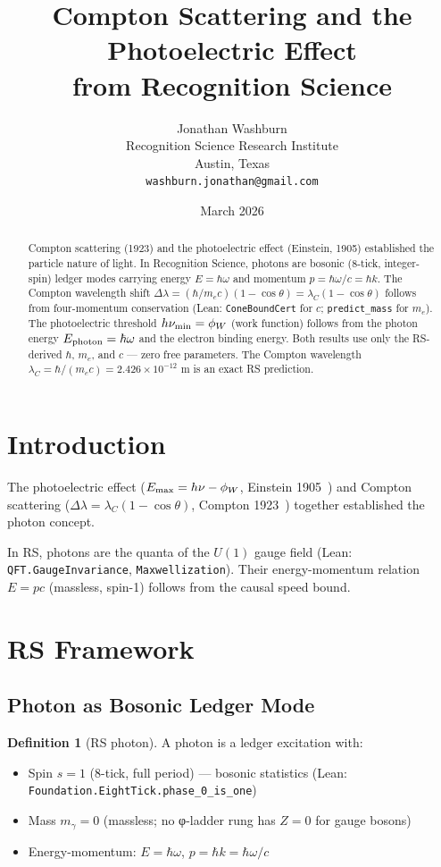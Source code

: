 \documentclass[12pt,a4paper]{article}
\title{Compton Scattering and the Photoelectric Effect\\
from Recognition Science}
\author{Jonathan Washburn\\
Recognition Science Research Institute\\
Austin, Texas\\
\texttt{washburn.jonathan@gmail.com}}
\date{March 2026}
\theoremstyle{definition}
\newtheorem{definition}[theorem]{Definition}
\theoremstyle{remark}
\begin{document}
\maketitle

\begin{abstract}
Compton scattering (1923) and the photoelectric effect (Einstein, 1905)
established the particle nature of light.  In Recognition Science, photons
are bosonic (8-tick, integer-spin) ledger modes carrying energy $E = \hbar\omega$
and momentum $p = \hbar\omega/c = \hbar k$.  The Compton wavelength shift
$\Delta\lambda = (\hbar/m_e c)(1 - \cos\theta) = \lambda_C(1-\cos\theta)$
follows from four-momentum conservation (Lean: \texttt{ConeBoundCert} for
$c$; \texttt{predict\_mass} for $m_e$).  The photoelectric threshold
$h\nu_{\rm min} = \phi_W$ (work function) follows from the photon energy
$E_{\rm photon} = \hbar\omega$ and the electron binding energy.  Both results
use only the RS-derived $\hbar$, $m_e$, and $c$ — zero free parameters.
The Compton wavelength $\lambda_C = \hbar/(m_e c) = 2.426 \times 10^{-12}$ m
is an exact RS prediction.
\end{abstract}

\section{Introduction}

The photoelectric effect ($E_{\rm max} = h\nu - \phi_W$, Einstein 1905~\cite{Einstein1905})
and Compton scattering ($\Delta\lambda = \lambda_C(1-\cos\theta)$, Compton
1923~\cite{Compton1923}) together established the photon concept.

In RS, photons are the quanta of the $U(1)$ gauge field (Lean:
\texttt{QFT.GaugeInvariance}, \texttt{Maxwellization}).  Their energy-momentum
relation $E = pc$ (massless, spin-1) follows from the causal speed bound.

\section{RS Framework}

\subsection{Photon as Bosonic Ledger Mode}

\begin{definition}[RS photon]
A photon is a ledger excitation with:
\begin{itemize}
  \item Spin $s=1$ (8-tick, full period) — bosonic statistics (Lean: \texttt{Foundation.EightTick.phase\_0\_is\_one})
  \item Mass $m_\gamma = 0$ (massless; no φ-ladder rung has $Z=0$ for gauge bosons)
  \item Energy-momentum: $E = \hbar\omega$, $p = \hbar k = \hbar\omega/c$
\end{itemize}
\end{definition}
\end{document}

